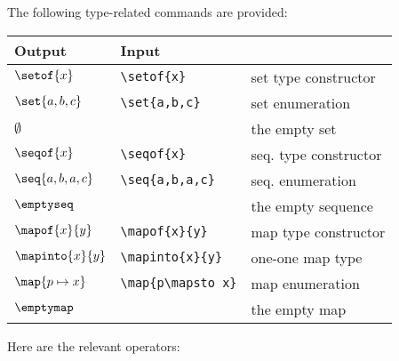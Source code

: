 \documentclass{article}
\renewcommand{\^}[1]{$\langle${\rm #1\/}$\rangle$}
\newcommand{\cs}[1]{\leavevmode\hbox{\tt \string#1}}
\begin{document}
The following type-related commands are provided:

\begin{center}
\begin{tabular}{|l|l|l|}
\hline
Output          & Input                 & \\
\hline
$\setof{x}$     & \verb;\setof{x};      & set type constructor \\
$\set{a,b,c}$   & \verb;\set{a,b,c};    & set enumeration \\
$\emptyset$     & \cs\emptyset          & the empty set \\
$\seqof{x}$     & \verb;\seqof{x};      & seq. type constructor\\
$\seq{a,b,a,c}$ & \verb;\seq{a,b,a,c};  & seq. enumeration\\
$\emptyseq$     & \cs\emptyseq  & the empty sequence \\
$\mapof{x}{y}$  & \verb;\mapof{x}{y};   & map type constructor \\
$\mapinto{x}{y}$& \verb;\mapinto{x}{y}; & one-one map type \\
$\map{p\mapsto x}$
                & \verb;\map{p\mapsto x}; & map enumeration\\
$\emptymap$     & \cs\emptymap  & the empty map \\
\hline
\end{tabular}
\end{center}

\noindent Here are the relevant operators:
\end{document}
